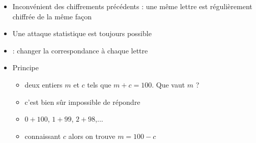 \begin{frame}

\begin{itemize}\setlength{\itemsep}{6pt}
  \item Inconvénient des chiffrements précédents : une même lettre est régulièrement chiffrée de la même façon
\pause  
  \item Une attaque statistique est toujours possible
\pause  
  \item {} : changer la correspondance à chaque lettre
\pause  
  \item Principe 
\pause  
  \begin{itemize}\setlength{\itemsep}{4pt}
    \item deux entiers $m$ et $c$ tels que $m+c=100$. Que vaut $m$ ?
\pause    
    \item c'est bien sûr impossible de répondre
\pause    
    \item $0+100$, $1+99$, $2+98$,...
\pause    
    \item connaissant $c$ alors on trouve $m=100-c$
  \end{itemize}
  
\end{itemize}

\end{frame}



